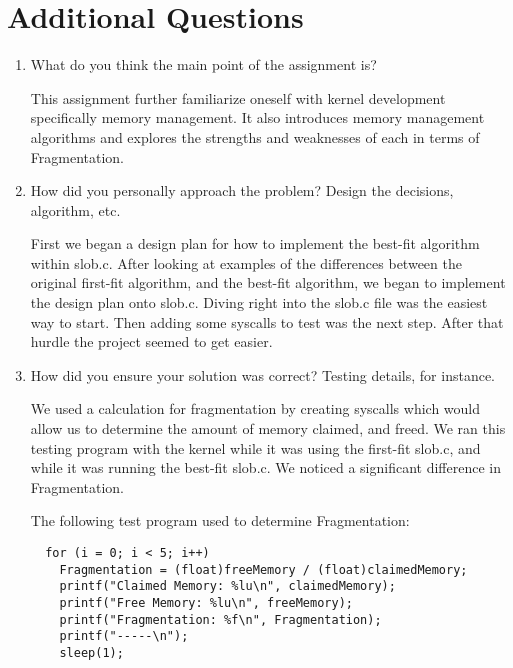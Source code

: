 \documentclass[onecolumn, draftclsnofoot,10pt, compsoc]{IEEEtran}
\begin{document}
\section{Additional Questions}
\begin{enumerate}
    \item What do you think the main point of the assignment is?
    
     \begin{singlespace}
  
  This assignment further familiarize oneself with kernel development specifically memory management. It also introduces memory management algorithms and explores the strengths and weaknesses of each in terms of Fragmentation. 
  
    \end{singlespace}
    
    \item How did you personally approach the problem? Design the decisions, algorithm, etc.
    \begin{singlespace} 
   
   First we began a design plan for how to implement the best-fit algorithm within slob.c. After looking at examples of the differences between the original first-fit algorithm, and the best-fit algorithm, we began to implement the design plan onto slob.c. Diving right into the slob.c file was the easiest way to start. Then adding some syscalls to test was the next step. After that hurdle the project seemed to get easier. 
    
    \end{singlespace}
    
    \item How did you ensure your solution was correct? Testing details, for instance.
    \begin{singlespace} 
 
 We used a calculation for fragmentation by creating syscalls which would allow us to determine the amount of memory claimed, and freed. We ran this testing program with the kernel while it was using the first-fit slob.c, and while it was running the best-fit slob.c. We noticed a significant difference in Fragmentation.
 
 The following test program used to determine Fragmentation:
     \end{singlespace}
 \begin{lstlisting}
  for (i = 0; i < 5; i++) 
    Fragmentation = (float)freeMemory / (float)claimedMemory;
    printf("Claimed Memory: %lu\n", claimedMemory);
    printf("Free Memory: %lu\n", freeMemory);
    printf("Fragmentation: %f\n", Fragmentation);
    printf("-----\n");
    sleep(1);
  \end{lstlisting}


\end{enumerate}
\end{document}
